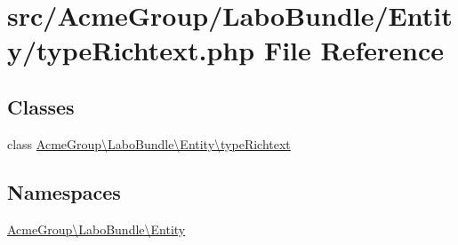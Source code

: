 \hypertarget{type_richtext_8php}{\section{src/\+Acme\+Group/\+Labo\+Bundle/\+Entity/type\+Richtext.php File Reference}
\label{type_richtext_8php}
}
\subsection*{Classes}
\begin{DoxyCompactItemize}
\item 
class \hyperlink{class_acme_group_1_1_labo_bundle_1_1_entity_1_1type_richtext}{Acme\+Group\textbackslash{}\+Labo\+Bundle\textbackslash{}\+Entity\textbackslash{}type\+Richtext}
\end{DoxyCompactItemize}
\subsection*{Namespaces}
\begin{DoxyCompactItemize}
\item 
 \hyperlink{namespace_acme_group_1_1_labo_bundle_1_1_entity}{Acme\+Group\textbackslash{}\+Labo\+Bundle\textbackslash{}\+Entity}
\end{DoxyCompactItemize}

